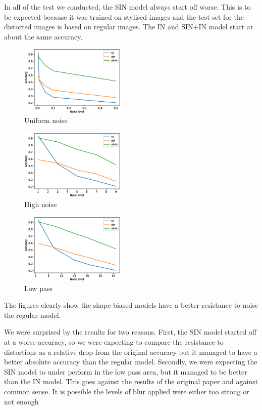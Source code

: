 \documentclass{article}
\begin{document}
In all of the test we conducted, the SIN model always start off worse. This is to be expected because it was trained on stylised images and the test set for the distorted images is based on regular images. The IN and SIN+IN model start at about the same accuracy.

\begin{figure}[h!]
\centering
\includegraphics[width = 0.45\textwidth]{imgs/uniform}
\caption{Uniform noise}
\end{figure}

\begin{figure}[h!]
\centering
\includegraphics[width = 0.45\textwidth]{imgs/high_pass}
\caption{High noise}
\end{figure}

\begin{figure}[h!]
\centering
\includegraphics[width = 0.45\textwidth]{imgs/low_pass}
\caption{Low pass}
\end{figure}

The figures clearly show the shape biased models have a better resistance to noise the regular model.

We were surprised by the results for two reasons.
First, the SIN model started off at a worse accuracy, so we were expecting to compare the resistance to distortions as a relative drop from the original accuracy but it managed to have a better absolute accuracy than the regular model.
Secondly, we were expecting the SIN model to under perform in the low pass area, but it managed to be better than the IN model. This goes against the results of the original paper and against common sense. It is possible the levels of blur applied were either too strong or not enough
\end{document}
